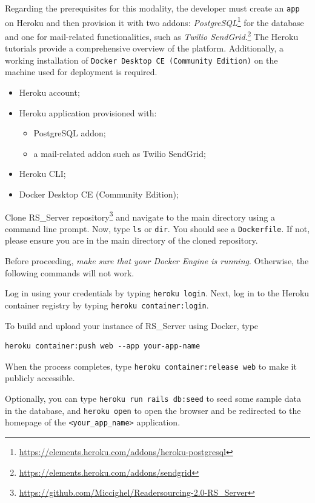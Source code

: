 \documentclass[a4paper, english]{article}
\newcounter{subsubsubsection}[subsubsection]
\newcommand{\rsserver}{RS\_Server\xspace}
\begin{document}
Regarding the prerequisites for this modality, the developer must create an \verb|app| on Heroku and then provision it with two addons: \emph{PostgreSQL}\footnote{\url{https://elements.heroku.com/addons/heroku-postgresql}} for the database and one for mail-related functionalities, such as \emph{Twilio SendGrid}.\footnote{\url{https://elements.heroku.com/addons/sendgrid}} The Heroku tutorials provide a comprehensive overview 
of the platform. Additionally, a working installation of \verb|Docker Desktop CE (Community Edition)| on the machine used for deployment is required.


\begin{itemize}
\item Heroku account;
\item Heroku application provisioned with:
\begin{itemize}
\item PostgreSQL addon;
\item a mail-related addon such as Twilio SendGrid;
\end{itemize}
\item Heroku CLI;
\item Docker Desktop CE (Community Edition);
\end{itemize}


Clone \rsserver repository\footnote{\url{https://github.com/Miccighel/Readersourcing-2.0-RS_Server}} and navigate to the main directory using a command line prompt. Now, type \verb|ls| or \verb|dir|. You should see a \verb|Dockerfile|. If not, please ensure you are in the main directory of the cloned repository.

Before proceeding, \emph{make sure that your Docker Engine is running}. Otherwise, the following commands will not work.

Log in using your credentials by typing \verb|heroku login|. Next, log in to the Heroku container registry by typing \verb|heroku container:login|.

To build and upload your instance of \rsserver using Docker, type
\begin{verbatim}
heroku container:push web --app your-app-name
\end{verbatim}
When the process completes, type \verb|heroku container:release web| to make it publicly accessible.

Optionally, you can type \verb|heroku run rails db:seed| to seed some sample data in the database, and \verb|heroku open| to open the browser and be redirected to the homepage of the \verb|<your_app_name>| application.
\end{document}
